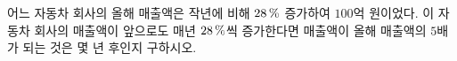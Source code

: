 어느 자동차 회사의 올해 매출액은 작년에 비해 $28\mkern3mu \%$ 증가하여 $100$억 원이었다. 이 자동차 회사의 매출액이 앞으로도 매년 $28\mkern3mu \%$씩 증가한다면 매출액이 올해 매출액의 $5$배가 되는 것은 몇 년 후인지 구하시오. 
